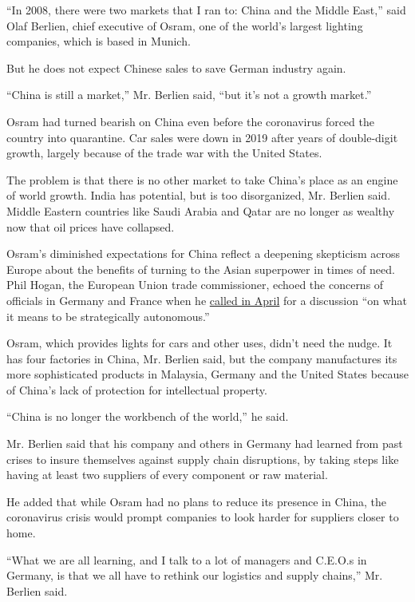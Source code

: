 ``In 2008, there were two markets that I ran to: China and the Middle
East,'' said Olaf Berlien, chief executive of Osram, one of the world's
largest lighting companies, which is based in Munich.

But he does not expect Chinese sales to save German industry again.

``China is still a market,'' Mr. Berlien said, ``but it's not a growth
market.''

Osram had turned bearish on China even before the coronavirus forced the
country into quarantine. Car sales were down in 2019 after years of
double-digit growth, largely because of the trade war with the United
States.

The problem is that there is no other market to take China's place as an
engine of world growth. India has potential, but is too disorganized,
Mr. Berlien said. Middle Eastern countries like Saudi Arabia and Qatar
are no longer as wealthy now that oil prices have collapsed.

Osram's diminished expectations for China reflect a deepening skepticism
across Europe about the benefits of turning to the Asian superpower in
times of need. Phil Hogan, the European Union trade commissioner, echoed
the concerns of officials in Germany and France when he
\href{https://ec.europa.eu/commission/commissioners/2019-2024/hogan/announcements/introductory-statement-commissioner-phil-hogan-informal-meeting-eu-trade-ministers_en}{called
in April} for a discussion ``on what it means to be strategically
autonomous.''

Osram, which provides lights for cars and other uses, didn't need the
nudge. It has four factories in China, Mr. Berlien said, but the company
manufactures its more sophisticated products in Malaysia, Germany and
the United States because of China's lack of protection for intellectual
property.

``China is no longer the workbench of the world,'' he said.

Mr. Berlien said that his company and others in Germany had learned from
past crises to insure themselves against supply chain disruptions, by
taking steps like having at least two suppliers of every component or
raw material.

He added that while Osram had no plans to reduce its presence in China,
the coronavirus crisis would prompt companies to look harder for
suppliers closer to home.

``What we are all learning, and I talk to a lot of managers and C.E.O.s
in Germany, is that we all have to rethink our logistics and supply
chains,'' Mr. Berlien said.

